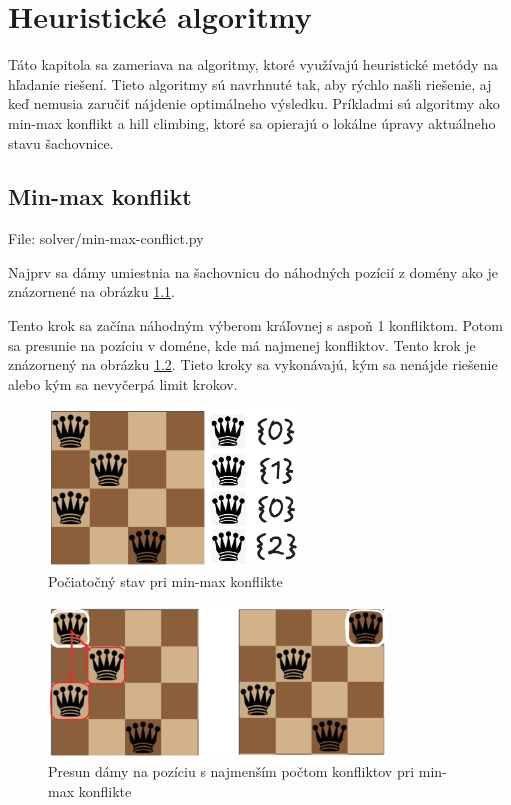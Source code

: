 

\chapter{Heuristické algoritmy}

Táto kapitola sa zameriava na algoritmy, ktoré využívajú heuristické metódy na hľadanie riešení. Tieto algoritmy sú navrhnuté tak, aby rýchlo našli riešenie, aj keď nemusia zaručiť nájdenie optimálneho výsledku. Príkladmi sú algoritmy ako min-max konflikt a hill climbing, ktoré sa opierajú o lokálne úpravy aktuálneho stavu šachovnice.

\section*{Min-max konflikt}
File: solver/min-max-conflict.py\par

Najprv sa dámy umiestnia na šachovnicu do náhodných pozícií z domény ako je znázornené na obrázku \ref{fig:min-max-zero-step}.

Tento krok sa začína náhodným výberom kráľovnej s aspoň 1 konfliktom. Potom sa presunie na pozíciu v doméne, kde má najmenej konfliktov. Tento krok je znázornený na obrázku \ref{fig:min-max-step}. Tieto kroky sa vykonávajú, kým sa nenájde riešenie alebo kým sa nevyčerpá limit krokov.
\begin{figure}[h]
  \centering
  \includegraphics[width=0.6\textwidth]{figs/min-max/min-max-zero-step}
  \caption{Počiatočný stav pri min-max konflikte}
  \label{fig:min-max-zero-step}
\end{figure}
\begin{figure}[!h]
  \centering
  \includegraphics[width=0.8\textwidth]{figs/min-max/min-max-step}
  \caption{Presun dámy na pozíciu s najmenším počtom konfliktov pri min-max konflikte}
  \label{fig:min-max-step}
\end{figure}


